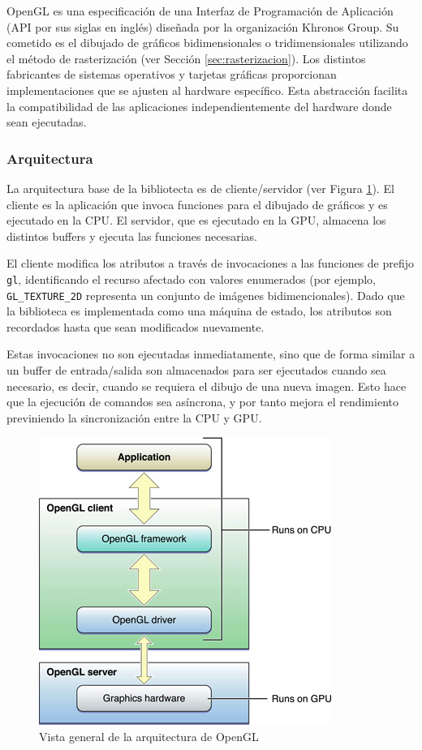 OpenGL es una especificación de una Interfaz de Programación de Aplicación (API por sus siglas en inglés) diseñada por la organización Khronos Group. Su cometido es el dibujado de gráficos bidimensionales o tridimensionales utilizando el método de rasterización (ver Sección \ref{sec:rasterizacion}). Los distintos fabricantes de sistemas operativos y tarjetas gráficas proporcionan implementaciones que se ajusten al hardware específico. Esta abstracción facilita la compatibilidad de las aplicaciones independientemente del hardware donde sean ejecutadas.

\subsubsection{Arquitectura}
La arquitectura base de la bibliotecta es de cliente/servidor (ver Figura \ref{img:gpucpugl}). El cliente es la aplicación que invoca funciones para el dibujado de gráficos y es ejecutado en la CPU. El servidor, que es ejecutado en la GPU, almacena los distintos buffers y ejecuta las funciones necesarias.

El cliente modifica los atributos a través de invocaciones a las funciones de prefijo \verb|gl|, identificando el recurso afectado con valores enumerados (por ejemplo, \verb|GL_TEXTURE_2D| representa un conjunto de imágenes bidimencionales). Dado que la biblioteca es implementada como una máquina de estado, los atributos son recordados hasta que sean modificados nuevamente.

Estas invocaciones no son ejecutadas inmediatamente, sino que de forma similar a un buffer de entrada/salida son almacenados para ser ejecutados cuando sea necesario, es decir, cuando se requiera el dibujo de una nueva imagen. Esto hace que la ejecución de comandos sea asíncrona, y por tanto mejora el rendimiento previniendo la sincronización entre la CPU y GPU.

\vspace{5mm}
\begin{figure}[h]
	\centering
	\includegraphics[width=.4\linewidth]{assets/cpu_gpu}
	\caption{Vista general de la arquitectura de OpenGL}
	\label{img:gpucpugl}
 \end{figure}

